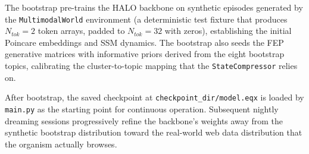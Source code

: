 The bootstrap pre-trains the HALO backbone on synthetic episodes generated by the \texttt{MultimodalWorld} environment (a deterministic test fixture that produces $N_{tok} = 2$ token arrays, padded to $N_{tok} = 32$ with zeros), establishing the initial Poincare embeddings and SSM dynamics. The bootstrap also seeds the FEP generative matrices with informative priors derived from the eight bootstrap topics, calibrating the cluster-to-topic mapping that the \texttt{StateCompressor} relies on.

After bootstrap, the saved checkpoint at \texttt{checkpoint\_dir/model.eqx} is loaded by \texttt{main.py} as the starting point for continuous operation. Subsequent nightly dreaming sessions progressively refine the backbone's weights away from the synthetic bootstrap distribution toward the real-world web data distribution that the organism actually browses.
